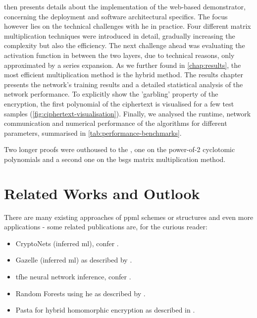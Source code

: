  then presents details about the implementation of the web-based demonstrator, concerning the deployment and software architectural specifics.
The focus however lies on the technical challenges with \glsdesc{he} in practice.
Four different matrix multiplication techniques were introduced in detail, gradually increasing the complexity but also the efficiency.
The next challenge ahead was evaluating the activation function in between the two layers, due to technical reasons, only approximated by a series expansion.
As we further found in \cref{chap:results}, the most efficient multiplication method is the hybrid method.
The results chapter presents the network's training results and a detailed statistical analysis of the network performance.
To explicitly show the 'garbling' property of the encryption, the first polynomial of the ciphertext is visualised for a few test samples (\cref{fig:ciphertext-visualisation}).
Finally, we analysed the runtime, network communication and numerical performance of the algorithms for different parameters, summarised in \cref{tab:performance-benchmarks}.

Two longer proofs were outhoused to the , one on the power-of-2 cyclotomic polynomials and a second one on the \gls{bsgs} matrix multiplication method.

\section{Related Works and Outlook}
There are many existing approaches of \gls{ppml} schemes or structures and even more applications - some related publications are, for the curious reader:
\begin{itemize}[noitemsep]
  \item CryptoNets (inferred \gls{ml}), confer \cite{2016-cryptonets}.
  \item Gazelle (inferred \gls{ml}) as described by \cite{2018-gazelle}.
  \item \gls{tfhe} neural network inference, confer \cite{2019-tfhe-original}.
  \item Random Forests using \gls{he} as described by \cite{2020-cryptotree}.
  \item Pasta for hybrid homomorphic encryption as described in \cite{2021-pasta}.
\end{itemize}

